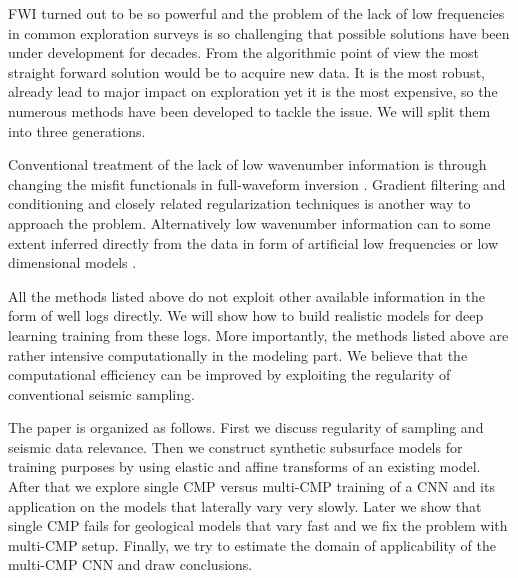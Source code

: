 \documentclass[paper,twocolomn]{geophysics}
\begin{document}
 FWI turned out to be so powerful and the problem of the lack of low frequencies in common exploration surveys is so challenging that possible solutions have been under development for decades. From the algorithmic point of view the most straight forward solution would be to acquire new data. It is the most robust, already lead to major impact on exploration \citep{fons2013,bpGOM_discovery} yet it is the most expensive, so the numerous methods have been developed to tackle the issue. We will split them into three generations.

Conventional treatment of the lack of low wavenumber information is through changing the misfit functionals in full-waveform inversion \citep[e.g.][]{luo1991wave, bozdag2011, choi2012, leeuwen2013}. 
Gradient filtering and conditioning \citep{ravaut2004multiscale, alkhalifah2015full, kazei2016, ovcharenko2018, ruan2018global} and closely related regularization techniques \citep{esserTotalvariationRegularizationStrategies2016, kazei2017TL, kazeiSaltbodyInversionMinimum2017, operto2018role, kalita2019regularized} is another way to approach the problem.
Alternatively low wavenumber information can to some extent inferred directly from the data in form of artificial low frequencies \citep{ovcharenkoNeuralNetworkBased2017,ovcharenkoLowFrequencyDataExtrapolation2018, ovcharenko2019deep, jin2018learn, kazei2019realistically} or low dimensional models \citep[e.g.][]{polo2018}.

All the methods listed above do not exploit other available information in the form of well logs directly.
We will show how to build realistic models for deep learning training from these logs. 
More importantly, the methods listed above are rather intensive computationally in the modeling part.
We believe that the computational efficiency can be improved by exploiting the regularity of conventional seismic sampling.

The paper is organized as follows. First we discuss regularity of sampling and seismic data relevance.
%
Then we construct synthetic subsurface models for training purposes by using elastic and affine transforms of an existing model.
%
After that we explore single CMP versus multi-CMP training of a CNN and its application on the models that laterally vary very slowly.
%
Later we show that single CMP fails for geological models that vary fast and we fix the problem with multi-CMP setup.
%
Finally, we try to estimate the domain of applicability of the multi-CMP CNN and draw conclusions.
\end{document}

